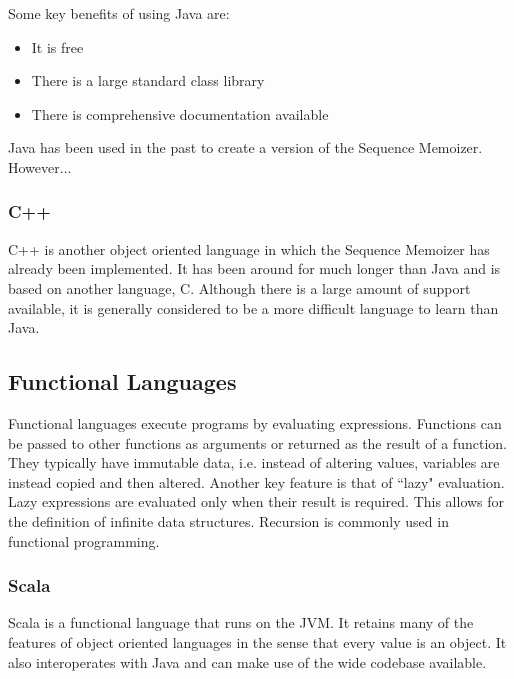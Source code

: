 Some key benefits of using Java are:

\begin{itemize}

\item It is free
\item There is a large standard class library
\item There is comprehensive documentation available 

\end{itemize}

Java has been used in the past to create a version of the Sequence Memoizer. However...



\subsubsection{C++}

C++ is another object oriented language in which the Sequence Memoizer has already been implemented. It has been around for much longer than Java and is based on another language, C. Although there is a large amount of support available, it is generally considered to be a more difficult language to learn than Java.


\subsection{Functional Languages}

Functional languages execute programs by evaluating expressions. Functions can be passed to other functions as arguments or returned as the result of a function. They typically have immutable data, i.e. instead of altering values, variables are instead copied and then altered. Another key feature is that of ``lazy" evaluation. Lazy expressions are evaluated only when their result is required. This allows for the definition of infinite data structures. Recursion is commonly used in functional programming. 

\subsubsection{Scala}

Scala is a functional language that runs on the JVM. It retains many of the features of object oriented languages in the sense that every value is an object. It also interoperates with Java and can make use of the wide codebase available.

